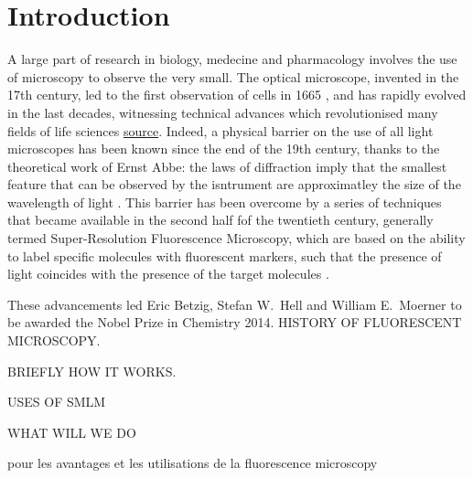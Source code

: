 \section{Introduction}
A large part of research in biology, medecine and pharmacology involves the use of microscopy to observe the very small.
The optical microscope, invented in the 17th century, led to the first observation of cells in 1665 \cite{reigoto_comparative_2021}, and has rapidly evolved in the last decades, witnessing technical advances which revolutionised many fields of life sciences \href{https://www.nature.com/articles/s42003-023-05468-9}{source}.
Indeed, a physical barrier on the use of all light microscopes has been known since the end of the 19th century, thanks to the theoretical work of Ernst Abbe: the laws of diffraction imply that the smallest feature that can be observed by the isntrument are approximatley the size of the wavelength of light \cite{diaspro_fundamentals_2011}.
This barrier has been overcome by a series of techniques that became available in the second half fof the twentieth century, generally termed Super-Resolution Fluorescence Microscopy, which are based on the ability to label specific molecules with fluorescent markers, such that the presence of light coincides with the presence of the target molecules \cite{douglass_notice_2023}.

These advancements led Eric Betzig, Stefan W.~Hell and William E.~Moerner to be awarded the Nobel Prize in Chemistry 2014.
HISTORY OF FLUORESCENT MICROSCOPY.

BRIEFLY HOW IT WORKS.

USES OF SMLM

WHAT WILL WE DO

\cite{sachl_introduction_2022} pour les avantages et les utilisations de la fluorescence microscopy
